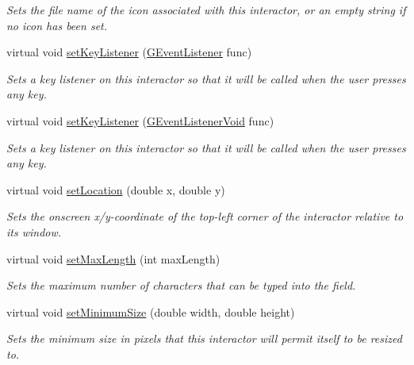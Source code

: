 \begin{DoxyCompactItemize}
\begin{DoxyCompactList}\small\item\em Sets the file name of the icon associated with this interactor, or an empty string if no icon has been set. \end{DoxyCompactList}\item 
virtual void \mbox{\hyperlink{classsgl_1_1GInteractor_aeb8324d3287fa1fbe093f4d6230cf0a6}{set\+Key\+Listener}} (\mbox{\hyperlink{namespacesgl_ae9f3e9eab70035da1a2b114e21357b25}{G\+Event\+Listener}} func)
\begin{DoxyCompactList}\small\item\em Sets a key listener on this interactor so that it will be called when the user presses any key. \end{DoxyCompactList}\item 
virtual void \mbox{\hyperlink{classsgl_1_1GInteractor_ae48ecea73606c7bd9423e1c7cc589cc9}{set\+Key\+Listener}} (\mbox{\hyperlink{namespacesgl_a54427ce97bb1c2804e4fe2b0a62e8b17}{G\+Event\+Listener\+Void}} func)
\begin{DoxyCompactList}\small\item\em Sets a key listener on this interactor so that it will be called when the user presses any key. \end{DoxyCompactList}\item 
virtual void \mbox{\hyperlink{classsgl_1_1GInteractor_a04594e8ba9b98513a64f1da00dcae18c}{set\+Location}} (double x, double y)
\begin{DoxyCompactList}\small\item\em Sets the onscreen x/y-\/coordinate of the top-\/left corner of the interactor relative to its window. \end{DoxyCompactList}\item 
virtual void \mbox{\hyperlink{classsgl_1_1GTextField_a077c24fa5337fbf431738f8ba513d19c}{set\+Max\+Length}} (int max\+Length)
\begin{DoxyCompactList}\small\item\em Sets the maximum number of characters that can be typed into the field. \end{DoxyCompactList}\item 
virtual void \mbox{\hyperlink{classsgl_1_1GInteractor_a0cf428e207b7f22cc08138a90b1b87b2}{set\+Minimum\+Size}} (double width, double height)
\begin{DoxyCompactList}\small\item\em Sets the minimum size in pixels that this interactor will permit itself to be resized to. \end{DoxyCompactList}\item 

\end{DoxyCompactItemize}

